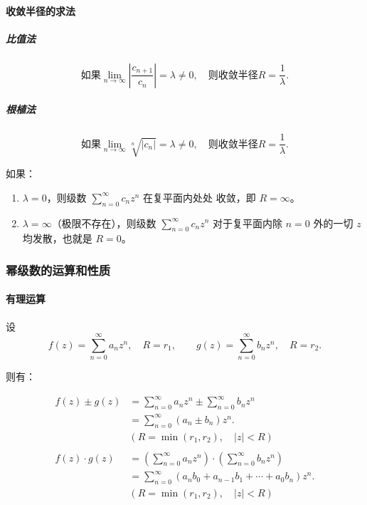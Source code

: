 \paragraph{收敛半径的求法}
\label{收敛半径的求法}
\subparagraph{比值法}
\label{比值法}
\[
\boxed{
    \text{如果} \lim_{n \to \infty} \left|\frac{c_{n+1}}{c_n}\right| = \lambda \ne 0, \quad \text{则收敛半径} R=\frac{1}{\lambda}.
}
\]
\subparagraph{根植法}
\label{根植法}
\[
\boxed{
    \text{如果} \lim_{n \to \infty} \sqrt[n]{|c_n|} = \lambda \ne 0, \quad \text{则收敛半径} R = \frac{1}{\lambda}.
}
\]

\begin{tcolorbox}[title={注意},colback=red!5!white
,colframe=red!75!black
,colbacktitle=yellow!50!red
,coltitle=red!25!black, fonttitle=\bfseries,subtitle style={boxrule=0.4pt, colback=yellow!50!red!25!white}]
如果：
\begin{enumerate}
\item \(\lambda = 0\)，则级数 \(\sum\limits _{n=0}^{\infty}c_n z^n\) 在复平面内处处
收敛，即 \(\boxed{R=\infty}\)。
\item \(\lambda = \infty\)（极限不存在），则级数 \(\sum\limits _{n=0}^{\infty}c_n
   z^n\) 对于复平面内除 \(n=0\) 外的一切 \(z\) 均发散，也就是 \(\boxed{R=0}\)。
\end{enumerate}

\end{tcolorbox}
\subsubsection{幂级数的运算和性质}
\label{幂级数的运算和性质}
\paragraph{有理运算}
\label{有理运算}
设
\[
f(z)=\sum_{n=0}^{\infty} a_{n}z^{n},\quad R=r_{1},\qquad g(z)=\sum_{n=0}^{\infty} b_{n}z^{n},\quad R=r_{2}.
\]

则有：

\begin{align*}
f(z)\pm g(z) &=\sum_{n=0}^{\infty} a_{n}z^{n}\pm\sum_{n=0}^{\infty} b_{n}z^{n}\\
&= \sum_{n=0}^{\infty}(a_{n}\pm b_{n})z^{n}.\\
& (R=\min(r_{1},r_{2}), \quad |z| < R)\\
\\
f(z)\cdot g(z) &=\left(\sum_{n=0}^{\infty} a_{n}z^{n}\right)\cdot\left(\sum_{n=0}^{\infty} b_{n}z^{n}\right)\\
& =\sum_{n=0}^{\infty}\left(a_{n}b_{0}+a_{n-1}b_{1}+\cdots+a_{0} b_{n}\right)z^{n}.\\
& (R=\min(r_{1},r_{2}), \quad |z| < R)
\end{align*}

